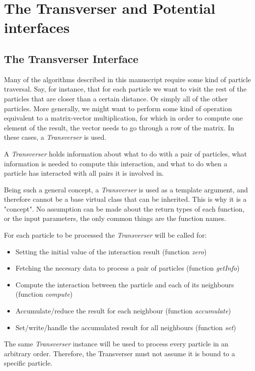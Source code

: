 \documentclass[ twoside,openright,titlepage,numbers=noenddot,%
headinclude,footinclude,cleardoublepage=empty,abstract=on,
BCOR=5mm,paper=a4,fontsize=11pt, dvipsnames
]{scrreprt}
\begin{document}
\chapter{The Transverser and Potential interfaces}\label{ch:transverser}
\section{The Transverser Interface} \label{sec:transverser}
Many of the algorithms described in this manuscript require some kind of particle traversal.
Say, for instance, that for each particle we want to visit the rest of the particles that are closer than a certain distance. Or simply all of the other particles. More generally, we might want to perform some kind of operation equivalent to a matrix-vector multiplication, for which in order to compute one element of the result, the vector needs to go through a row of the matrix.
In these cases, a \emph{Transverser} is used.

A \emph{Transverser} holds information about what to do with a pair of particles, what information is needed to compute this interaction, and what to do when a particle has interacted with all pairs it is involved in.  

Being such a general concept, a \emph{Transverser} is used as a template argument, and therefore cannot be a base virtual class that can be inherited. This is why it is a "concept". No assumption can be made about the return types of each function, or the input parameters, the only common things are the function names.  

For each particle to be processed the \emph{Transverser} will be called for: 
\begin{itemize}
\item Setting the initial value of the interaction result (function \emph{zero})
\item Fetching the necesary data to process a pair of particles  (function \emph{getInfo})
\item Compute the interaction between the particle  and each of its neighbours (function \emph{compute})
\item Accumulate/reduce  the result for each neighbour (function \emph{accumulate})
\item  Set/write/handle the accumulated result for all neighbours (function \emph{set})
 \end{itemize}
The same \emph{Transverser} instance will be used to process every particle in an arbitrary order. Therefore, the Transverser must not assume it is bound to a specific particle.
\end{document}

